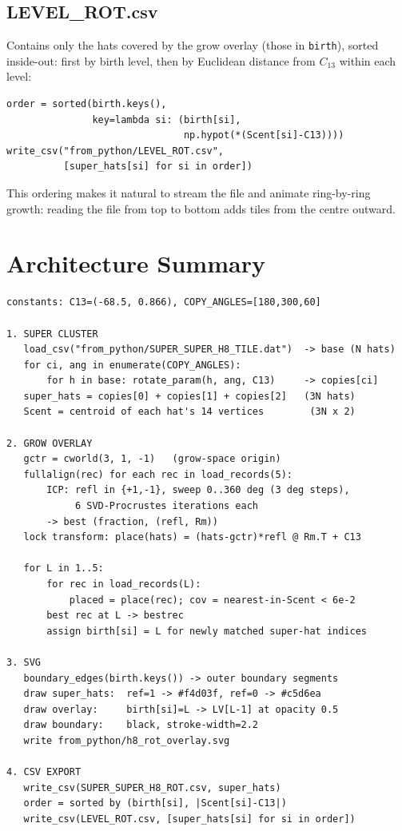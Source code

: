 \documentclass[10pt,a4paper]{article}
\let\polysection\section
\renewcommand\section{\needspace{0.16\textheight}\polysection}
\let\polysubsection\subsection
\renewcommand\subsection{\needspace{0.12\textheight}\polysubsection}
\newcommand{\code}[1]{\texttt{\small #1}}
\begin{document}
\subsection{LEVEL\_ROT.csv}

Contains only the hats covered by the grow overlay (those in \code{birth}),
sorted inside-out: first by birth level, then by Euclidean distance from
$C_{13}$ within each level:

\begin{verbatim}
order = sorted(birth.keys(),
               key=lambda si: (birth[si],
                               np.hypot(*(Scent[si]-C13))))
write_csv("from_python/LEVEL_ROT.csv",
          [super_hats[si] for si in order])
\end{verbatim}

\noindent This ordering makes it natural to stream the file and animate
ring-by-ring growth: reading the file from top to bottom adds tiles
from the centre outward.

\section{Architecture Summary}

\begin{center}
\begin{tcolorbox}[
  colframe=rulecolor, colback=white, boxrule=0.6pt, arc=3pt,
  width=0.98\linewidth
]
\begin{verbatim}
constants: C13=(-68.5, 0.866), COPY_ANGLES=[180,300,60]

1. SUPER CLUSTER
   load_csv("from_python/SUPER_SUPER_H8_TILE.dat")  -> base (N hats)
   for ci, ang in enumerate(COPY_ANGLES):
       for h in base: rotate_param(h, ang, C13)     -> copies[ci]
   super_hats = copies[0] + copies[1] + copies[2]   (3N hats)
   Scent = centroid of each hat's 14 vertices        (3N x 2)

2. GROW OVERLAY
   gctr = cworld(3, 1, -1)   (grow-space origin)
   fullalign(rec) for each rec in load_records(5):
       ICP: refl in {+1,-1}, sweep 0..360 deg (3 deg steps),
            6 SVD-Procrustes iterations each
       -> best (fraction, (refl, Rm))
   lock transform: place(hats) = (hats-gctr)*refl @ Rm.T + C13

   for L in 1..5:
       for rec in load_records(L):
           placed = place(rec); cov = nearest-in-Scent < 6e-2
       best rec at L -> bestrec
       assign birth[si] = L for newly matched super-hat indices

3. SVG
   boundary_edges(birth.keys()) -> outer boundary segments
   draw super_hats:  ref=1 -> #f4d03f, ref=0 -> #c5d6ea
   draw overlay:     birth[si]=L -> LV[L-1] at opacity 0.5
   draw boundary:    black, stroke-width=2.2
   write from_python/h8_rot_overlay.svg

4. CSV EXPORT
   write_csv(SUPER_SUPER_H8_ROT.csv, super_hats)
   order = sorted by (birth[si], |Scent[si]-C13|)
   write_csv(LEVEL_ROT.csv, [super_hats[si] for si in order])
\end{verbatim}
\end{tcolorbox}
\end{center}
\end{document}
